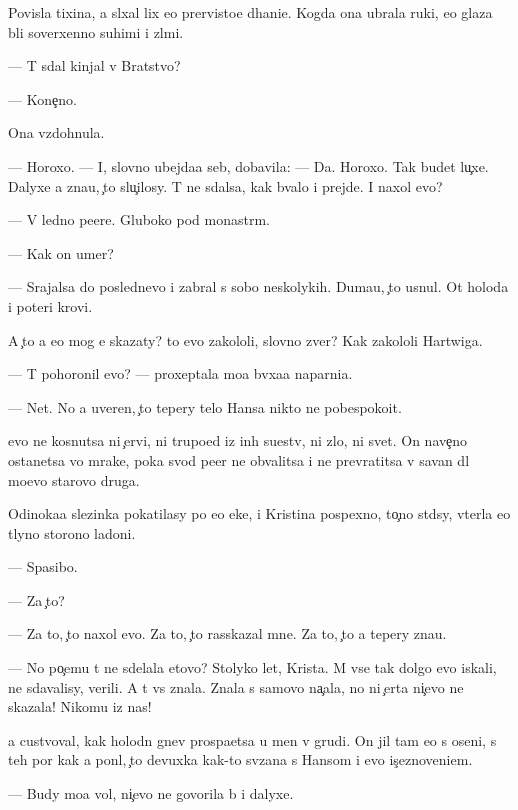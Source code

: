 \documentclass[10pt]{book}
\begin{document}
Povisla tixina, {\y}a sl{\yi}xal lix {\y}e{\y}o prer{\yi}visto{\y}e d{\yi}hani{\y}e. Kogda ona ubrala ruki, {\y}e{\y}o glaza b{\yi}li soverxenno suhimi i zl{\yi}mi.

— T{\yi} sdal kinjal v Bratstvo?

— Kone{\c}no.

Ona vzdohnula.

— Horoxo. — I, slovno ubejda{\y}a seb{\ia}, dobavila: — Da. Horoxo. Tak budet lu{\c}xe. Dalyxe {\y}a zna{\y}u, {\c}to slu{\c}ilosy. T{\yi} ne sdalsa, kak b{\yi}valo i prejde. I naxol {\y}evo?

— V led{\ia}no{\y} pe{\x}ere. Gluboko pod monast{\yi}r{\e}m.

— Kak on umer?

— Srajalsa do poslednevo i zabral s sobo{\y} neskolykih. Duma{\y}u, {\c}to usnul. Ot holoda i poteri krovi.

A {\c}to {\y}a {\y}e{\x}o mog {\y}e{\y} skazaty? {\C}to {\y}evo zakololi, slovno zver{\ia}? Kak zakololi Hartwiga.

— T{\yi} pohoronil {\y}evo? — proxeptala mo{\y}a b{\yi}vxa{\y}a naparni{\q}a.

— Net. No {\y}a uveren, {\c}to tepery telo Hansa nikto ne pobespoko{\y}it.

{\Y}evo ne kosnutsa ni {\c}ervi, ni trupo{\y}ed{\yi} iz in{\yi}h su{\x}estv, ni zlo, ni svet. On nave{\c}no ostanetsa vo mrake, poka svod pe{\x}er{\yi} ne obvalitsa i ne prevratitsa v savan dl{\ia} mo{\y}evo starovo druga.

Odinoka{\y}a slezinka pokatilasy po {\y}e{\y}o {\x}eke, i Kristina pospexno, to{\c}no st{\yi}d{\ia}sy, v{\yi}terla {\y}e{\y}o t{\yi}lyno{\y} storono{\y} ladoni.

— Spasibo.

— Za {\c}to?

— Za to, {\c}to naxol {\y}evo. Za to, {\c}to rasskazal mne. Za to, {\c}to {\y}a tepery zna{\y}u.

— No po{\c}emu t{\yi} ne sdelala etovo? Stolyko let, Krista. M{\yi} vse tak dolgo {\y}evo iskali, ne sdavalisy, verili. A t{\yi} vs{\e} znala. Znala s samovo na{\c}ala, no ni {\c}erta ni{\c}evo ne skazala! Nikomu iz nas!

{\Y}a custvoval, kak holodn{\yi}{\y} gnev pros{\yi}pa{\y}etsa u men{\ia} v grudi. On jil tam {\y}e{\x}o s oseni, s teh por kak {\y}a pon{\ia}l, {\c}to devuxka kak-to sv{\ia}zana s Hansom i {\y}evo is{\c}eznoveni{\y}em.

— Budy mo{\y}a vol{\ia}, ni{\c}evo ne govorila b{\yi} i dalyxe.
\end{document}

